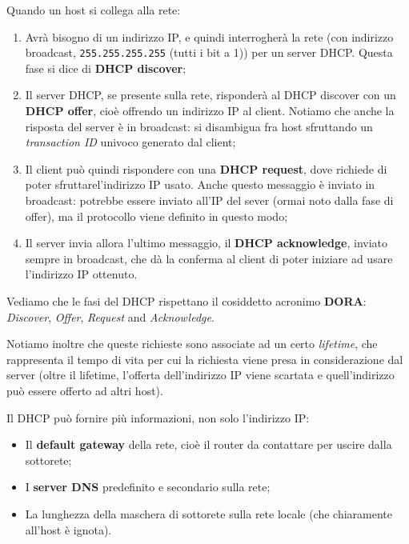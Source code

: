 \documentclass[a4paper,11pt]{article}
\begin{document}
Quando un host si collega alla rete:
\begin{enumerate}
	\item Avrà bisogno di un indirizzo IP, e quindi interrogherà la rete (con indirizzo broadcast, \lstinline|255.255.255.255| (tutti i bit a 1)) per un server DHCP. Questa fase si dice di \textbf{DHCP discover};
	\item Il server DHCP, se presente sulla rete, risponderà al DHCP discover con un \textbf{DHCP offer}, cioè offrendo un indirizzo IP al client. Notiamo che anche la risposta del server è in broadcast: si disambigua fra host sfruttando un \textit{transaction ID} univoco generato dal client;
	\item Il client può quindi rispondere con una \textbf{DHCP request}, dove richiede di poter sfruttarel'indirizzo IP usato. Anche questo messaggio è inviato in broadcast: potrebbe essere inviato all'IP del sever (ormai noto dalla fase di offer), ma il protocollo viene definito in questo modo;
	\item Il server invia allora l'ultimo messaggio, il \textbf{DHCP acknowledge}, inviato sempre in broadcast, che dà la conferma al client di poter iniziare ad usare l'indirizzo IP ottenuto.
\end{enumerate}

Vediamo che le fasi del DHCP rispettano il cosiddetto acronimo \textbf{DORA}: \textit{Discover}, \textit{Offer}, \textit{Request} and \textit{Acknowledge}.

Notiamo inoltre che queste richieste sono associate ad un certo \textit{lifetime}, che rappresenta il tempo di vita per cui la richiesta viene presa in considerazione dal server (oltre il lifetime, l'offerta dell'indirizzo IP viene scartata e quell'indirizzo può essere offerto ad altri host).

Il DHCP può fornire più informazioni, non solo l'indirizzo IP:
\begin{itemize}
	\item Il \textbf{default gateway} della rete, cioè il router da contattare per uscire dalla sottorete;
	\item I \textbf{server DNS} predefinito e secondario sulla rete;
	\item La lunghezza della maschera di sottorete sulla rete locale (che chiaramente all'host è ignota).
\end{itemize}
\end{document}
